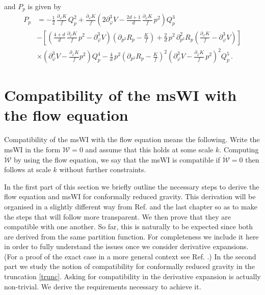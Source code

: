 \documentclass[11pt]{book} %
\numberwithin{equation}{chapter}
\begin{document}
and $P_p$ is given by
\begin{align}
	P_p &= - \frac{1}{2} \, \frac{\partial_\varphi K}{f} \, Q_p^2
	+ \frac{\partial_\varphi K}{f}
  \left(
    2 \partial_\varphi^3 V
    - \frac{2d+1}{d} \, \frac{\partial_{\varphi}K}{f} \, p^2
  \right) Q_p^3 \nonumber \\
  & -
  \left[
    \left(
      \frac{4+d}{d} \, \frac{\partial_\varphi K}{f} \, p^2
      - \partial^3_\varphi V
    \right)
    \left(
      \partial_{p^2} R_p - \frac{K}{f}
    \right)
    + \frac{2}{d} \, p^2 \, \partial^2_{p^2} R_p
    \left(
      \frac{\partial_\varphi K}{f} - \partial_\varphi^3 V
    \right)
  \right] \nonumber \\
  & \times \left(\partial_\varphi^3 V - \frac{\partial_\varphi K}{f}p^2\right)Q_p^4
  -\frac{4}{d} \, p^2
  \left(
    \partial_{p^2}R_p-\frac{K}{f}
  \right)^2
  \left(
    \partial_\varphi^3 V - \frac{\partial_\varphi K}{f} \, p^2
  \right)^2 Q_p^5 \,.
\end{align}

\section{Compatibility of the msWI with the flow equation}

Compatibility of the msWI with the flow equation means the following.
Write the msWI in the form $\mathcal{W}=0$ and assume that this holds at some scale $k$.
Computing $\dot{\mathcal{W}}$ by using the flow equation,
we say that the msWI is compatible if $\dot{\mathcal{W}}=0$ then follows at scale $k$ without further
constraints.

In the first part of this section we briefly outline the necessary steps to derive the flow equation
and msWI for conformally reduced gravity.
This derivation will be organised in a slightly different way from Ref. \cite{Dietz:2015owa}
and the last chapter so as to make the steps that will follow more transparent.
We then prove that they are compatible with one another.
So far, this is naturally to be expected since both are derived from the same partition function.
For completeness we include it here in order to fully understand the issues once we consider derivative
expansions. (For a proof of the exact case in a more general context see Ref. \cite{Safari:2015dva}.)
In the second part we study the notion of compatibility for conformally reduced gravity in the
truncation \eqref{trunc}. Asking for compatibility in the derivative expansion is actually non-trivial.
We derive the requirements necessary to achieve it.
\end{document}
